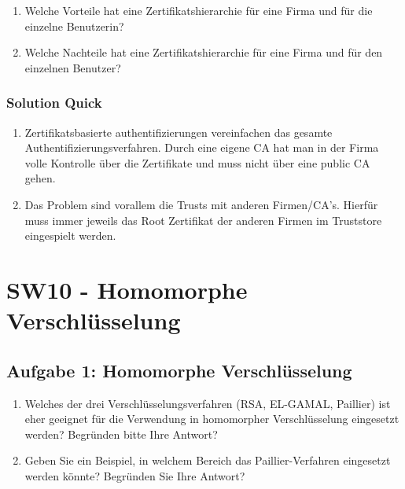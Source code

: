 \documentclass[11pt]{article}
\providecommand{\tightlist}{%
      \setlength{\itemsep}{0pt}\setlength{\parskip}{0pt}}
\begin{document}
\begin{enumerate}
\def\labelenumi{\arabic{enumi}.}
\tightlist
\item
  Welche Vorteile hat eine Zertifikatshierarchie für eine Firma und für
  die einzelne Benutzerin?
\item
  Welche Nachteile hat eine Zertifikatshierarchie für eine Firma und für
  den einzelnen Benutzer?
\end{enumerate}

\hypertarget{solution-quick}{%
\subsubsection{Solution Quick}\label{solution-quick}}

\begin{enumerate}
\def\labelenumi{\arabic{enumi}.}
\item
  Zertifikatsbasierte authentifizierungen vereinfachen das gesamte
  Authentifizierungsverfahren. Durch eine eigene CA hat man in der Firma
  volle Kontrolle über die Zertifikate und muss nicht über eine public
  CA gehen.
\item
  Das Problem sind vorallem die Trusts mit anderen Firmen/CA's. Hierfür
  muss immer jeweils das Root Zertifikat der anderen Firmen im
  Truststore eingespielt werden.
\end{enumerate}

    

    \hypertarget{sw10---homomorphe-verschluxfcsselung}{%
\section{SW10 - Homomorphe
Verschlüsselung}\label{sw10---homomorphe-verschluxfcsselung}}

    \hypertarget{aufgabe-1-homomorphe-verschluxfcsselung}{%
\subsection{Aufgabe 1: Homomorphe
Verschlüsselung}\label{aufgabe-1-homomorphe-verschluxfcsselung}}

\begin{enumerate}
\def\labelenumi{\arabic{enumi}.}
\tightlist
\item
  Welches der drei Verschlüsselungsverfahren (RSA, EL-GAMAL, Paillier)
  ist eher geeignet für die Verwendung in homomorpher Verschlüsselung
  eingesetzt werden? Begründen bitte Ihre Antwort?
\item
  Geben Sie ein Beispiel, in welchem Bereich das Paillier-Verfahren
  eingesetzt werden könnte? Begründen Sie Ihre Antwort?
\end{enumerate}
\end{document}
